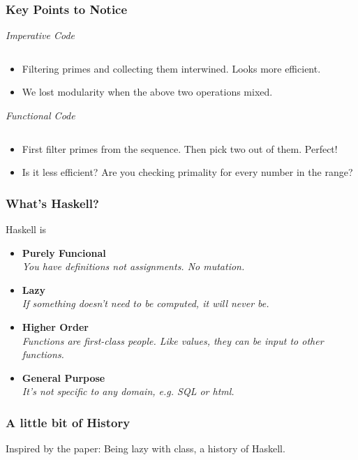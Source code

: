 \documentclass{beamer}
\begin{document}
\begin{frame}[fragile,t]
  \frametitle{Key Points to Notice}

  \begin{multicols}{2}
    \emph{Imperative Code}
    \inputminted[fontsize=\tiny]{c}{code/slides/primes.c}

    \begin{itemize}
    \item Filtering primes and collecting them interwined. Looks more efficient.
    \item We lost modularity when the above two operations mixed.
    \end{itemize}

    \columnbreak

    \emph{Functional Code}
    \inputminted[fontsize=\tiny]{haskell}{code/slides/Primes.hs}

    \begin{itemize}
    \item First filter primes from the sequence. Then pick two out of them. Perfect!
    \item Is it less efficient? Are you checking primality for every number in the range?
    \end{itemize}

  \end{multicols}
  \vfill

\end{frame}

\begin{frame}[t]
  \frametitle{What's Haskell?}

  Haskell is
  \begin{itemize}
  \item{\bf Purely Funcional} \\
    \textit{You have definitions not assignments. No mutation.}

  \item{\bf Lazy} \\
    \textit{If something doesn't need to be computed, it will never be.}

  \item{\bf Higher Order} \\
    \textit{Functions are first-class people. Like values, they can be input to other functions.}

  \item{\bf General Purpose} \\
    \textit{It's not specific to any domain, e.g. SQL or html.}

  \end{itemize}
\end{frame}

\begin{frame}[t]
  \frametitle{A little bit of History}
  Inspired by the paper: Being lazy with class, a history of Haskell.


\end{frame}

\begin{frame}[t]

\end{frame}
\end{document}
